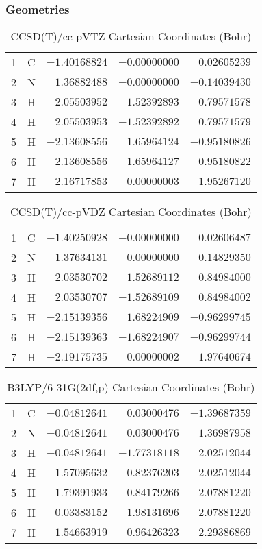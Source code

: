 \documentclass[10pt,oneside]{article}
\begin{document}
\subsubsection*{Geometries}
\begin{table}[h!]
\centering
\caption{CCSD(T)/cc-pVTZ Cartesian Coordinates (Bohr)}
\begin{tabular}{llrrr}
1  & C  & $-1.40168824$ & $-0.00000000$ & $ 0.02605239$ \\
2  & N  & $ 1.36882488$ & $-0.00000000$ & $-0.14039430$ \\
3  & H  & $ 2.05503952$ & $ 1.52392893$ & $ 0.79571578$ \\
4  & H  & $ 2.05503953$ & $-1.52392892$ & $ 0.79571579$ \\
5  & H  & $-2.13608556$ & $ 1.65964124$ & $-0.95180826$ \\
6  & H  & $-2.13608556$ & $-1.65964127$ & $-0.95180822$ \\
7  & H  & $-2.16717853$ & $ 0.00000003$ & $ 1.95267120$ \\
\end{tabular}
\end{table}

\begin{table}[h!]
\centering
\caption{CCSD(T)/cc-pVDZ Cartesian Coordinates (Bohr)}
\begin{tabular}{llrrr}
1  & C  & $-1.40250928$ & $-0.00000000$ & $ 0.02606487$ \\
2  & N  & $ 1.37634131$ & $-0.00000000$ & $-0.14829350$ \\
3  & H  & $ 2.03530702$ & $ 1.52689112$ & $ 0.84984000$ \\
4  & H  & $ 2.03530707$ & $-1.52689109$ & $ 0.84984002$ \\
5  & H  & $-2.15139356$ & $ 1.68224909$ & $-0.96299745$ \\
6  & H  & $-2.15139363$ & $-1.68224907$ & $-0.96299744$ \\
7  & H  & $-2.19175735$ & $ 0.00000002$ & $ 1.97640674$ \\
\end{tabular}
\end{table}

\begin{table}[h!]
\centering
\caption{B3LYP/6-31G(2df,p) Cartesian Coordinates (Bohr)}
\begin{tabular}{llrrr}
1  & C  & $-0.04812641$ & $ 0.03000476$ & $-1.39687359$ \\
2  & N  & $-0.04812641$ & $ 0.03000476$ & $ 1.36987958$ \\
3  & H  & $-0.04812641$ & $-1.77318118$ & $ 2.02512044$ \\
4  & H  & $ 1.57095632$ & $ 0.82376203$ & $ 2.02512044$ \\
5  & H  & $-1.79391933$ & $-0.84179266$ & $-2.07881220$ \\
6  & H  & $-0.03383152$ & $ 1.98131696$ & $-2.07881220$ \\
7  & H  & $ 1.54663919$ & $-0.96426323$ & $-2.29386869$ \\
\end{tabular}
\end{table}
\end{document}
